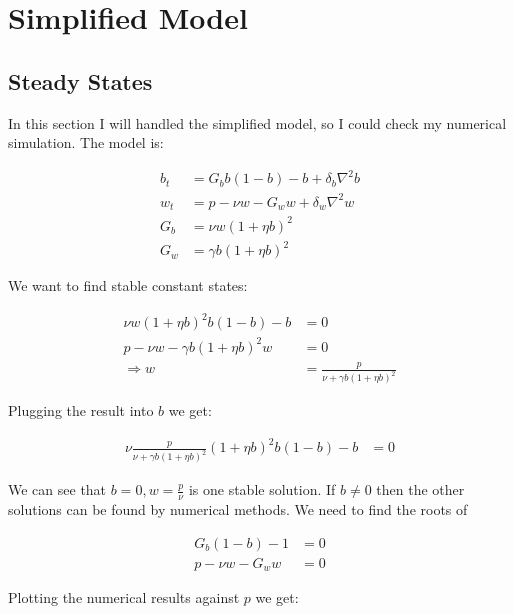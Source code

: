 \section{Simplified Model}

\subsection{Steady States}

In this section I will handled the simplified model, so I could check
my numerical simulation. The model is:

\begin{align*}
b_{t} & =G_{b}b\left(1-b\right)-b+\delta_{b}\nabla^{2}b\\
w_{t} & =p-\nu w-G_{w}w+\delta_{w}\nabla^{2}w\\
G_{b} & =\nu w\left(1+\eta b\right)^{2}\\
G_{w} & =\gamma b\left(1+\eta b\right)^{2}
\end{align*}

We want to find stable constant states:

\begin{align*}
\nu w\left(1+\eta b\right)^{2}b\left(1-b\right)-b & =0\\
p-\nu w-\gamma b\left(1+\eta b\right)^{2}w & =0\\
\Rightarrow w & =\frac{p}{\nu+\gamma b\left(1+\eta b\right)^{2}}
\end{align*}

Plugging the result into $b$ we get:

\begin{align*}
\nu\frac{p}{\nu+\gamma b\left(1+\eta b\right)^{2}}\left(1+\eta b\right)^{2}b\left(1-b\right)-b & =0
\end{align*}

We can see that $b=0,w=\frac{p}{\nu}$ is one stable solution. If
$b\neq0$ then the other solutions can be found by numerical methods.
We need to find the roots of

\begin{align*}
G_{b}\left(1-b\right)-1 & =0\\
p-\nu w-G_{w}w & =0
\end{align*}

Plotting the numerical results against $p$ we get:

